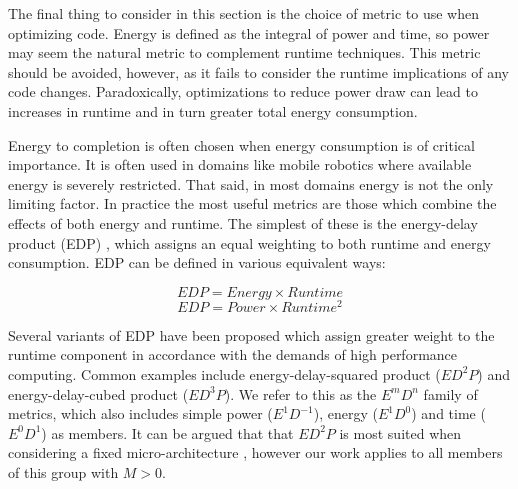 The final thing to consider in this section is the choice of metric to use when optimizing code. Energy is defined as the integral of power and time, so power may seem the natural metric to complement runtime techniques. This metric should be avoided, however, as it fails to consider the runtime implications of any code changes. Paradoxically, optimizations to reduce power draw can lead to increases in runtime and in turn greater total energy consumption.

Energy to completion is often chosen when energy consumption is of critical importance. It is often used in domains like mobile robotics where available energy is severely restricted. That said, in most domains energy is not the only limiting factor. In practice the most useful metrics are those which combine the effects of both energy and runtime. The simplest of these is the energy-delay product (EDP) \cite{gonzales:1995aa}, which assigns an equal weighting to both runtime and energy consumption. EDP can be defined in various equivalent ways:\golden

\begin{equation}
EDP = Energy \times Runtime
\end{equation}
\begin{equation}
\label{eq:edp}
EDP = Power \times Runtime^{2}
\end{equation}

Several variants of EDP have been proposed which assign greater weight to the runtime component in accordance with the demands of high performance computing. Common examples include energy-delay-squared product ($ED^{2}P$) and energy-delay-cubed product ($ED^{3}P$). We refer to this as the $E^mD^n$ family of metrics, which also includes simple power ($E^1D^{-1}$), energy ($E^1D^0$) and time ($E^0D^1$) as members. It can be argued that that $ED^{2}P$ is most suited when considering a fixed micro-architecture \cite{brooks:2000aa}, however our work applies to all members of this group with $M > 0$.